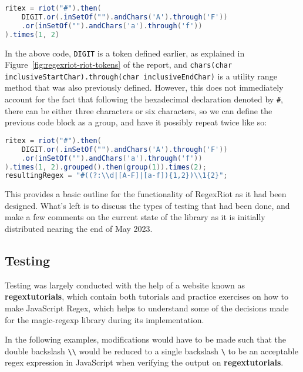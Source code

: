 \documentclass[conference]{IEEEtran}
\begin{document}
\begin{lstlisting}[language=Java]
ritex = riot("#").then(
    DIGIT.or(.inSetOf("").andChars('A').through('F'))
    .or(inSetOf("").andChars('a').through('f'))
).times(1, 2)
\end{lstlisting}

In the above code, \texttt{DIGIT} is a token defined earlier, as explained in
Figure~\ref{fig:regexriot-riot-tokens} of the report, and
\texttt{chars(char inclusiveStartChar).through(char inclusiveEndChar)} is a utility
range method that was also previously defined. However, this does not immediately
account for the fact that following the hexadecimal declaration denoted by
\texttt{\#}, there can be either three characters or six characters, so we can define
the previous code block as a group, and have it possibly repeat twice like so:

\begin{lstlisting}[language=Java]
ritex = riot("#").then(
    DIGIT.or(.inSetOf("").andChars('A').through('F'))
    .or(inSetOf("").andChars('a').through('f'))
).times(1, 2).grouped().then(group(1)).times(2);
resultingRegex = "#((?:\\d|[A-F]|[a-f]){1,2})\\1{2}";
\end{lstlisting}

This provides a basic outline for the functionality of RegexRiot as
it had been designed. What's left is to discuss the types of testing that
had been done, and make a few comments on the current state of the library
as it is initially distributed nearing the end of May 2023.

\subsection{Testing}

Testing was largely conducted with the help of a website known as
\textbf{regextutorials}, which contain both tutorials and
practice exercises on how to make JavaScript Regex, which helps to
understand some of the decisions made for the magic-regexp library
during its implementation. \cite{regextutorials}

In the following examples, modifications would have to be made such
that the double backslash \texttt{\textbackslash\textbackslash} would be reduced to a single backslash
\texttt{\textbackslash} to be an acceptable regex expression in JavaScript when verifying the
output on \textbf{regextutorials}. \cite{regextutorials}
\end{document}
